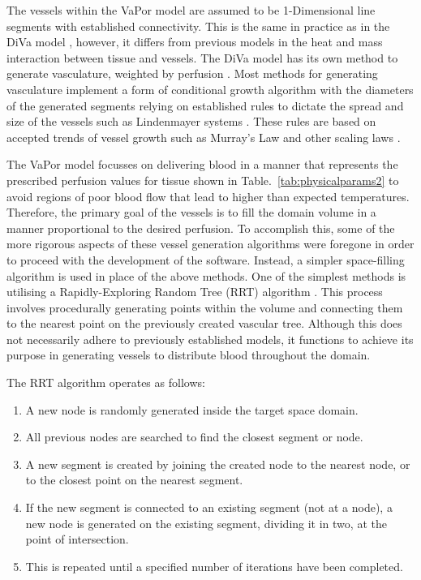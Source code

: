 \documentclass[11pt,english,a4paper,twoside,openright]{report}
\begin{document}
{{{{{{{{The vessels within the VaPor model are assumed to be 1-Dimensional line segments with established connectivity. This is the same in practice as in the DiVa model \cite{kotte1999modelling}, however, it differs from previous models in the heat and mass interaction between tissue and vessels. The DiVa model has its own method to generate vasculature, weighted by perfusion \cite{van1998flexible}. Most methods for generating vasculature implement a form of conditional growth algorithm with the diameters of the generated segments relying on established rules to dictate the spread and size of the vessels such as Lindenmayer systems \cite{galarreta2013three}\cite{zamir2001arterial}. These rules are based on accepted trends of vessel growth such as Murray's Law \cite{murray1926physiological} and other scaling laws \cite{francis2009scaling}. 

The VaPor model focusses on delivering blood in a manner that represents the prescribed perfusion values for tissue shown in Table.~\ref{tab:physicalparams2} to avoid regions of poor blood flow that lead to higher than expected temperatures. Therefore, the primary goal of the vessels is to fill the domain volume in a manner proportional to the desired perfusion. To accomplish this, some of the more rigorous aspects of these vessel generation algorithms were foregone in order to proceed with the development of the software. Instead, a simpler space-filling algorithm is used in place of the above methods. One of the simplest methods is utilising a Rapidly-Exploring Random Tree (RRT) algorithm \cite{lavalle1998rapidly}. This process involves procedurally generating points within the volume and connecting them to the nearest point on the previously created vascular tree. Although this does not necessarily adhere to previously established models, it functions to achieve its purpose in generating vessels to distribute blood throughout the domain. 

The RRT algorithm operates as follows: 

\begin{enumerate}
	\setlength\itemsep{0em}
	\item A new node is randomly generated inside the target space domain.
	\item All previous nodes are searched to find the closest segment or node.
	\item A new segment is created by joining the created node to the nearest node, or to the closest point on the nearest segment.
	\item If the new segment is connected to an existing segment (not at a node), a new node is generated on the existing segment, dividing it in two, at the point of intersection.
	\item This is repeated until a specified number of iterations have been completed.
\end{enumerate}

}}}}}}}}
\end{document}
